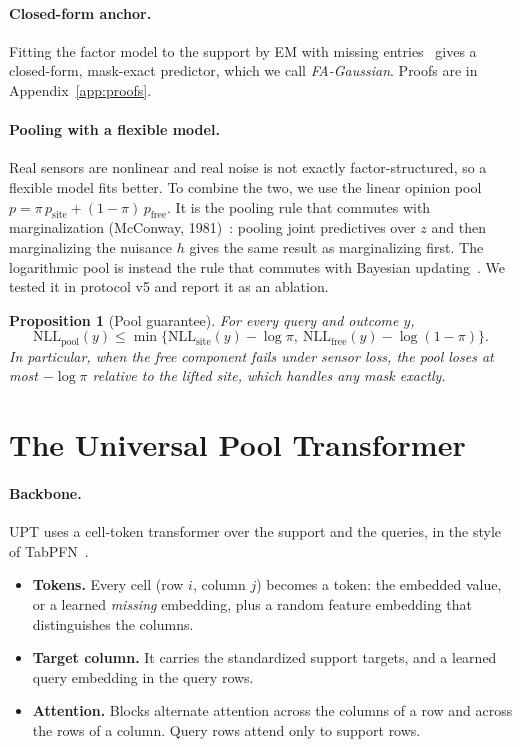 \documentclass{article}
\newtheorem{proposition}{Proposition}
\newcommand{\NLL}{\mathrm{NLL}}
\begin{document}
\paragraph{Closed-form anchor.} Fitting the factor model to the support by EM with missing
entries~\citep{dempster1977em,rubin1982em} gives a closed-form, mask-exact predictor, which we call
\emph{FA-Gaussian}. Proofs are in Appendix~\ref{app:proofs}.

\paragraph{Pooling with a flexible model.} Real sensors are nonlinear and real noise is not exactly factor-structured, so a
flexible model fits better. To combine the two, we use the linear opinion pool
$p=\pi\,p_{\mathrm{site}}+(1-\pi)\,p_{\mathrm{free}}$. It is the pooling rule that commutes with marginalization
(McConway, 1981)~\citep{mcconway1981marginalization}: pooling joint predictives over $z$ and then marginalizing the
nuisance $h$ gives the same result as marginalizing first. The logarithmic pool is instead the rule that commutes
with Bayesian updating~\citep{genest1984characterization}. We tested it in protocol v5 and report it as an ablation.

\begin{proposition}[Pool guarantee]\label{prop:pool}
For every query and outcome $y$,
\[\NLL_{\mathrm{pool}}(y)\leq\min\{\NLL_{\mathrm{site}}(y)-\log\pi,\ \NLL_{\mathrm{free}}(y)-\log(1-\pi)\}.\]
In particular, when the free component fails under sensor loss, the pool loses at most $-\log\pi$ relative to the
lifted site, which handles any mask exactly.
\end{proposition}

\section{The Universal Pool Transformer}
\label{sec:upt}



\paragraph{Backbone.} UPT uses a cell-token transformer over the support and the queries, in the style of
TabPFN~\citep{hollmann2025tabpfnv2}.
\begin{itemize}
  \item \textbf{Tokens.} Every cell (row $i$, column $j$) becomes a token: the embedded value, or a learned \emph{missing}
  embedding, plus a random feature embedding that distinguishes the columns.
  \item \textbf{Target column.} It carries the standardized support targets, and a learned query embedding in the query rows.
  \item \textbf{Attention.} Blocks alternate attention across the columns of a row and across the rows of a column. Query rows
  attend only to support rows.
\end{itemize}
\end{document}

